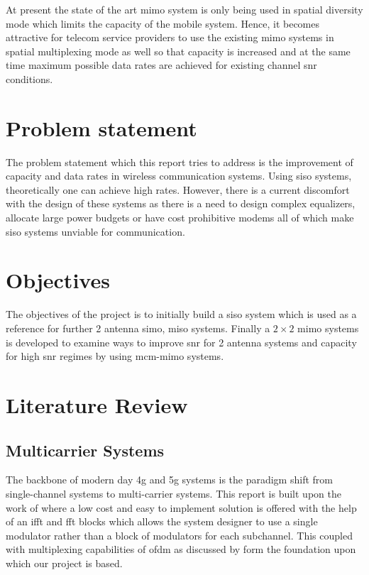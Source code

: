 At present the state of the art \acrshort{mimo} system is only being used in \gls{spatial diversity} mode which limits the capacity of the mobile system. Hence, it becomes attractive for telecom service providers to use the existing \acrshort{mimo} systems in \gls{spatial multiplexing} mode as well so that capacity is increased and at the same time maximum possible data rates are achieved for existing channel \acrshort{snr} conditions.  

\section[Problem statement]{\textbf{Problem statement}}
The problem statement which this report tries to address is the improvement of capacity and data rates in wireless communication systems. Using \acrshort{siso} systems, theoretically one can achieve high rates. However, there is a current discomfort with the design of these systems as there is a need to design complex equalizers, allocate large power budgets or have cost prohibitive modems all of which make  \acrshort{siso} systems unviable for communication.

\section[Objectives]{\textbf{Objectives}}
The objectives of the project is to initially build a \acrshort{siso} system which is used as a reference for further 2 antenna \acrshort{simo}, \acrshort{miso} systems. Finally a $2 \times 2$ \acrshort{mimo} systems is developed to examine ways to improve \acrshort{snr} for 2 antenna systems and capacity for high \acrshort{snr} regimes by using \acrshort{mcm}-\acrshort{mimo} systems.

\section{Literature Review}

\subsection{Multicarrier Systems}
The backbone of modern day \acrshort{4g} and \acrshort{5g} systems is the paradigm shift from single-channel systems to multi-carrier systems. This report is built upon the work of \textcite{Weinstein1971} where a low cost and easy to implement solution is offered with the help of an \acrshort{ifft} and \acrshort{fft} blocks which allows the system designer to use a single modulator rather than a block of modulators for each subchannel. This coupled with multiplexing capabilities of \acrshort{ofdm} as discussed by \textcite{Wu1995} form the foundation upon which our project is based.
 
